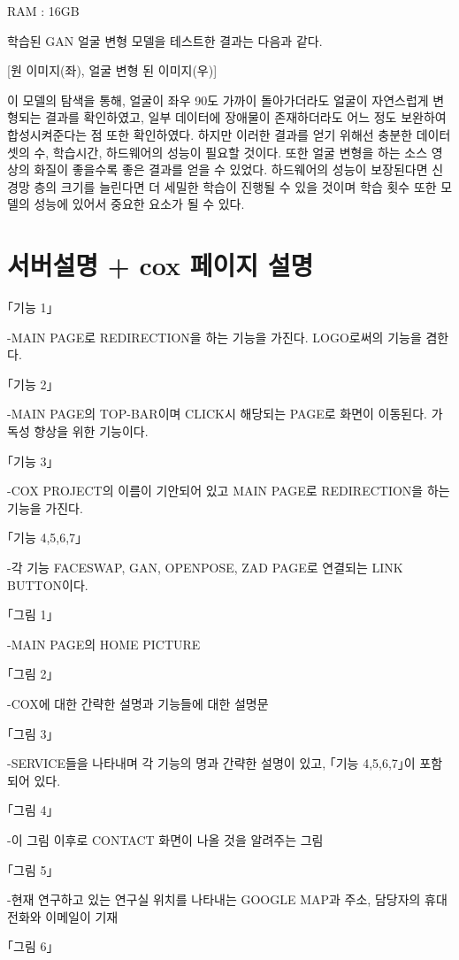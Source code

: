 \documentclass{oblivoir}
\begin{document}
RAM : 16GB

학습된 GAN 얼굴 변형 모델을 테스트한 결과는 다음과 같다.

   [원 이미지(좌), 얼굴 변형 된 이미지(우)]

이 모델의 탐색을 통해, 얼굴이 좌우 90도 가까이 돌아가더라도 얼굴이 자연스럽게 변형되는 결과를 확인하였고, 일부 데이터에 장애물이 존재하더라도 어느 정도 보완하여 합성시켜준다는 점 또한 확인하였다. 하지만 이러한 결과를 얻기 위해선 충분한 데이터 셋의 수, 학습시간, 하드웨어의 성능이 필요할 것이다. 또한 얼굴 변형을 하는 소스 영상의 화질이 좋을수록 좋은 결과를 얻을 수 있었다. 하드웨어의 성능이 보장된다면 신경망 층의 크기를 늘린다면 더 세밀한 학습이 진행될 수 있을 것이며 학습 횟수 또한 모델의 성능에 있어서 중요한 요소가 될 수 있다.


\section{ 서버설명 + cox 페이지 설명}

｢기능 1｣

-MAIN PAGE로 REDIRECTION을 하는 기능을 가진다. LOGO로써의 기능을 겸한다.

｢기능 2｣

-MAIN PAGE의 TOP-BAR이며 CLICK시 해당되는 PAGE로 화면이 이동된다. 가독성 향상을 위한 기능이다.

｢기능 3｣

-COX PROJECT의 이름이 기안되어 있고 MAIN PAGE로 REDIRECTION을 하는 기능을 가진다.

｢기능 4,5,6,7｣

-각 기능 FACESWAP, GAN, OPENPOSE, ZAD PAGE로 연결되는 LINK BUTTON이다.

｢그림 1｣

-MAIN PAGE의 HOME PICTURE

｢그림 2｣

-COX에 대한 간략한 설명과 기능들에 대한 설명문

｢그림 3｣

-SERVICE들을 나타내며 각 기능의 명과 간략한 설명이 있고, ｢기능 4,5,6,7｣이 포함되어 있다.

｢그림 4｣

-이 그림 이후로 CONTACT 화면이 나올 것을 알려주는 그림

｢그림 5｣

-현재 연구하고 있는 연구실 위치를 나타내는 GOOGLE MAP과 주소, 담당자의 휴대전화와 이메일이 기재

｢그림 6｣
\end{document}
